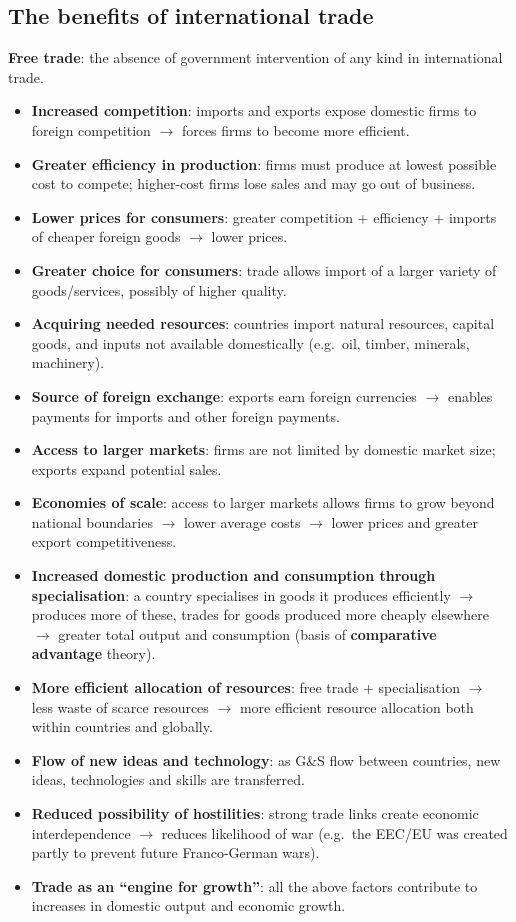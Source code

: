 \documentclass[a4paper,12pt]{article}
\newcommand{\needbold}[1]{\textcolor{red!70!black}{\textbf{#1}}}
\begin{document}
\subsection{The benefits of international trade}
\needbold{Free trade}: the absence of government intervention of any kind in international trade.
\begin{itemize}
  \item \textbf{Increased competition}: imports and exports expose domestic firms to foreign competition $\to$ forces firms to become more efficient.
  \item \textbf{Greater efficiency in production}: firms must produce at lowest possible cost to compete; higher-cost firms lose sales and may go out of business.
  \item \textbf{Lower prices for consumers}: greater competition + efficiency + imports of cheaper foreign goods $\to$ lower prices.
  \item \textbf{Greater choice for consumers}: trade allows import of a larger variety of goods/services, possibly of higher quality.
  \item \textbf{Acquiring needed resources}: countries import natural resources, capital goods, and inputs not available domestically (e.g.\ oil, timber, minerals, machinery).
  \item \textbf{Source of foreign exchange}: exports earn foreign currencies $\to$ enables payments for imports and other foreign payments.
  \item \textbf{Access to larger markets}: firms are not limited by domestic market size; exports expand potential sales.
  \item \textbf{Economies of scale}: access to larger markets allows firms to grow beyond national boundaries $\to$ lower average costs $\to$ lower prices and greater export competitiveness.
  \item \textbf{Increased domestic production and consumption through specialisation}: a country specialises in goods it produces efficiently $\to$ produces more of these, trades for goods produced more cheaply elsewhere $\to$ greater total output and consumption (basis of \textbf{comparative advantage} theory).
  \item \textbf{More efficient allocation of resources}: free trade + specialisation $\to$ less waste of scarce resources $\to$ more efficient resource allocation both within countries and globally.
  \item \textbf{Flow of new ideas and technology}: as G\&S flow between countries, new ideas, technologies and skills are transferred.
  \item \textbf{Reduced possibility of hostilities}: strong trade links create economic interdependence $\to$ reduces likelihood of war (e.g.\ the EEC/EU was created partly to prevent future Franco-German wars).
  \item \textbf{Trade as an ``engine for growth''}: all the above factors contribute to increases in domestic output and economic growth.
\end{itemize}
\end{document}
